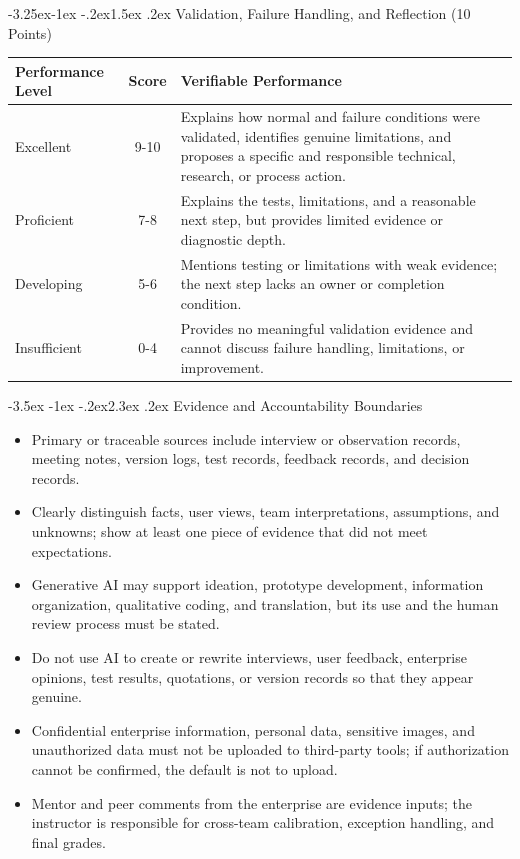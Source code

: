 \documentclass[11pt]{article}
\makeatletter
\renewcommand\section{\@startsection{section}{1}{\z@}%
    {-3.5ex \@plus -1ex \@minus -.2ex}{2.3ex \@plus.2ex}%
    {\normalfont\Large\sffamily\bfseries}}
\renewcommand\subsection{\@startsection{subsection}{2}{\z@}%
    {-3.25ex\@plus -1ex \@minus -.2ex}{1.5ex \@plus .2ex}%
    {\normalfont\large\sffamily\bfseries}}
\newcommand{\formaltable}{%
  \small
  \setlength{\tabcolsep}{5pt}%
  \renewcommand{\arraystretch}{1.2}%
  \setlength{\arrayrulewidth}{0.4pt}%
}
\renewcommand{\arraystretch}{1.2}
\makeatother
\begin{document}
\subsection{Validation, Failure Handling, and Reflection (10 Points)}
\begin{center}
\formaltable
\begin{tabularx}{\textwidth}{|l|c|Y|}
\hline
\textbf{Performance Level} & \textbf{Score} & \textbf{Verifiable Performance} \\ \hline
Excellent & 9-10 & Explains how normal and failure conditions were validated, identifies genuine limitations, and proposes a specific and responsible technical, research, or process action. \\ \hline
Proficient & 7-8 & Explains the tests, limitations, and a reasonable next step, but provides limited evidence or diagnostic depth. \\ \hline
Developing & 5-6 & Mentions testing or limitations with weak evidence; the next step lacks an owner or completion condition. \\ \hline
Insufficient & 0-4 & Provides no meaningful validation evidence and cannot discuss failure handling, limitations, or improvement. \\ \hline
\end{tabularx}
\end{center}

\section{Evidence and Accountability Boundaries}
\begin{itemize}
  \item Primary or traceable sources include interview or observation records, meeting notes, version logs, test records, feedback records, and decision records.
  \item Clearly distinguish facts, user views, team interpretations, assumptions, and unknowns; show at least one piece of evidence that did not meet expectations.
  \item Generative AI may support ideation, prototype development, information organization, qualitative coding, and translation, but its use and the human review process must be stated.
  \item Do not use AI to create or rewrite interviews, user feedback, enterprise opinions, test results, quotations, or version records so that they appear genuine.
  \item Confidential enterprise information, personal data, sensitive images, and unauthorized data must not be uploaded to third-party tools; if authorization cannot be confirmed, the default is not to upload.
  \item Mentor and peer comments from the enterprise are evidence inputs; the instructor is responsible for cross-team calibration, exception handling, and final grades.
\end{itemize}
\end{document}

